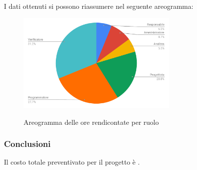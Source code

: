 \pagebreak
I dati ottenuti si possono riassumere nel seguente areogramma:
\begin{figure}[H] 
			\centering 
				\includegraphics[width=0.7\textwidth]{res/images/areogramma_rendicontate.pdf}\\
				\caption{Areogramma delle ore rendicontate per ruolo}
			\label{AreogrammaOreRendicontate}
\end{figure}

\subsubsection{Conclusioni}
Il costo totale preventivato per il progetto è .

